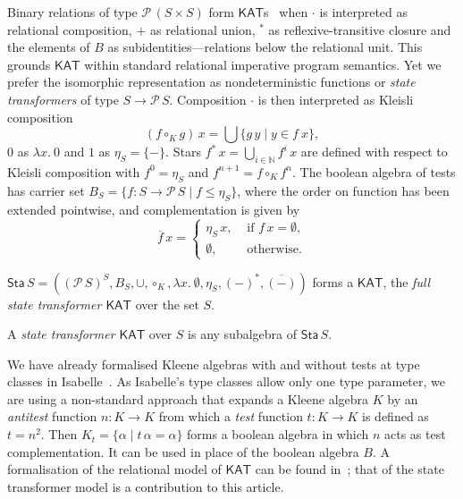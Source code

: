 \documentclass[envcountsames]{llncs}
\newcommand{\KAT}{\mathsf{KAT}}
\newcommand{\Pow}{\mathcal{P}}
\newcommand{\sta}{\mathsf{Sta}}
\begin{document}
Binary relations of type $\Pow\, (S\times S)$ form
$\KAT$s~\cite{Kozen97} when $\cdot$ is interpreted as relational
composition, $+$ as relational union, $^\ast$ as reflexive-transitive
closure and the elements of $B$ as subidentities---relations below the
relational unit. This grounds $\KAT$ within standard relational
imperative program semantics. Yet we prefer the isomorphic
representation as nondeterministic functions or \emph{state
  transformers} of type $S\to \Pow\, S$.  Composition $\cdot$ is then
interpreted as Kleisli composition
\begin{equation*} 
(f\circ_K g)\, x = \bigcup\{g\, y\mid y \in f\ x \}, 
\end{equation*} 
$0$ as $\lambda x.\ 0$ and $1$ as $\eta_S = \{-\}$.  Stars
$f^{\ast}\, x = \bigcup_{i\in\mathbb{N}} f^i\, x$ are defined with
  respect to Kleisli composition with $f^{0} = \eta_S$ and
  $f^{n+1} = f \circ_K f^{n}$. The boolean algebra of tests has
  carrier set $B_S=\{f:S\to \Pow\, S \mid f\le \eta_S\}$, where the
  order on function has been extended pointwise,  and complementation
  is given by
  \begin{equation*} 
    \overline{f}\, x =
  \begin{cases}
    \eta_S\, x, & \text{ if } f\, x = \emptyset,\\
\emptyset, & \text{ otherwise}.
  \end{cases}
\end{equation*}

\begin{proposition}\label{P:kleisli-ka}
$\sta\, S = ((\Pow\, S)^S,B_S,\cup,\circ_K,\lambda x.\
  \emptyset, \eta_S,(-)^{\ast},\overline{(-)})$
  forms a $\KAT$, the \emph{full state transformer $\KAT$} over the
  set $S$.
\end{proposition}
A \emph{state transformer $\KAT$} over $S$ is any subalgebra of
$\sta\, S$. 

We have already formalised Kleene algebras with and without tests at
type classes in Isabelle~\cite{afp:ka,afp:kat}.  As Isabelle's type
classes allow only one type parameter, we are using a non-standard
approach that expands a Kleene algebra $K$ by an \emph{antitest}
function $n:K\to K$ from which a \emph{test} function $t:K\to K$ is
defined as $t=n^2$. Then $K_t = \{\alpha \mid t\, \alpha = \alpha\}$
forms a boolean algebra in which $n$ acts as test complementation. It
can be used in place of the boolean algebra $B$.  A formalisation of
the relational model of $\KAT$ can be found in~\cite{afp:kat}; that of
the state transformer model is a contribution to this article.
\end{document}
